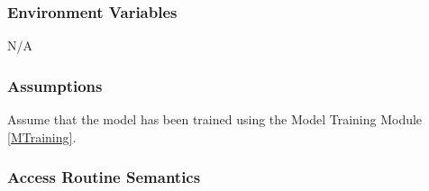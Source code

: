 \documentclass[12pt, titlepage]{article}
\begin{document}
\subsubsection{Environment Variables}

N/A

\subsubsection{Assumptions}

Assume that the model has been trained using the Model Training Module
\ref{MTraining}.

\subsubsection{Access Routine Semantics}
\end{document}
